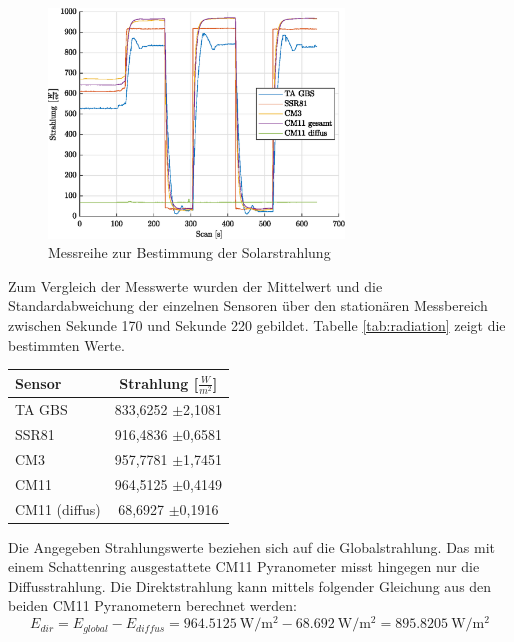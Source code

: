 \begin{figure}[H]
	\centering
	\includegraphics[width=0.7\textwidth]{../DATA/Messreihe_Strahlung.eps}
	\caption[Messreihe zur Bestimmung der Solarstrahlung]{Messreihe zur Bestimmung der Solarstrahlung}
	\label{fig:radiation}
\end{figure}
Zum Vergleich der Messwerte wurden der Mittelwert und die Standardabweichung der einzelnen Sensoren über den stationären Messbereich zwischen Sekunde 170 und Sekunde 220 gebildet. Tabelle \ref{tab:radiation} zeigt die bestimmten Werte.
\begin{center}
\begin{tabular}{l|c}
	\label{tab:radiation}
	
	\textbf{Sensor} & \textbf{Strahlung [$\frac{W}{m^2}$]}\\
	\hline
	TA GBS & 833,6252 $\pm$2,1081\\
	SSR81 & 916,4836 $\pm$0,6581\\
	CM3 & 957,7781 $\pm$1,7451\\
	CM11 & 964,5125 $\pm$0,4149\\
	CM11 (diffus) & 68,6927 $\pm$0,1916
\end{tabular} 
\end{center}

Die Angegeben Strahlungswerte beziehen sich auf die Globalstrahlung. Das mit einem Schattenring ausgestattete CM11 Pyranometer misst hingegen nur die Diffusstrahlung. Die Direktstrahlung kann mittels folgender Gleichung aus den beiden CM11 Pyranometern berechnet werden:
\begin{equation}
	\label{eq:Edir}
	E_{dir}=E_{global}-E_{diffus}=\SI{964.5125}{\watt\per\square\meter}-\SI{68.692}{\watt\per\square\meter} = \SI{895.8205}{\watt\per\square\meter}
\end{equation}

